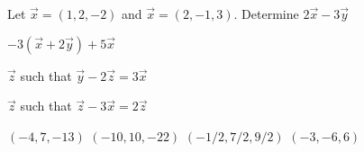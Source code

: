 
\begin{Exercise}[
name={},
title={}, 
difficulty=0,
origin={\cite{SM}}]
Let $\vec{x}=(1,2,-2)$ and $\vec{x}=(2,-1,3)$. Determine
\Question $2\vec{x}-3\vec{y}$

\Question $-3(\vec{x}+2\vec{y})+5\vec{x}$

\Question $\vec{z}$ such that $\vec{y}-2\vec{z}=3\vec{x}$

\Question $\vec{z}$ such that $\vec{z}-3\vec{x}=2\vec{z}$

\end{Exercise}

\begin{Answer}
\Question $(-4,7,-13)$
\Question $(-10,10,-22)$
\Question $(-1/2,7/2,9/2)$
\Question $(-3,-6,6)$
\end{Answer}
